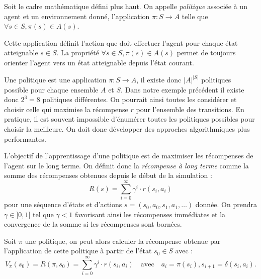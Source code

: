 \begin{definition}[Politique]
    Soit le cadre mathématique défini plus haut. On appelle \emph{politique} associée à un agent et un environnement donné, l'application $ \pi : S \longrightarrow A$ telle que $ \forall s \in S, \pi(s) \in A(s)$.
\end{definition}

Cette application définit l'action que doit effectuer l'agent pour chaque état atteignable $s \in S$. La propriété $ \forall s \in S, \pi(s) \in A(s)$ permet de toujours orienter l'agent vers un état atteignable depuis l'état courant. 

\begin{remark}
    Une politique est une application $ \pi : S \longrightarrow A$, il existe donc $ |A|^{|S|}$ politiques possible pour chaque ensemble $A$ et $S$. Dans notre exemple précédent il existe donc $2^3 = 8$ politiques différentes. On pourrait ainsi toutes les considérer et choisir celle qui maximise la récompense $r$ pour l'ensemble des transitions. En pratique, il est souvent impossible d'énumérer toutes les politiques possibles pour choisir la meilleure. On doit donc développer des approches algorithmiques plus performantes. 
\end{remark}

\begin{definition}
    L'objectif de l'apprentissage d'une politique est de maximiser les récompenses de l'agent sur le long terme. On définit donc la \emph{récompense à long terme} comme la somme des récompenses obtenues depuis le début de la simulation : 
    \begin{equation}
        R(s) = \sum_{i=0}^{\infty} \gamma^i \cdot r(s_i, a_i)
    \end{equation}
    pour une séquence d'états et d'actions $s = (s_0, a_0, s_1, a_1, \dots)$ donnée. On prendra $ \gamma \in ]0, 1]$ tel que $ \gamma < 1$ favorisant ainsi les récompenses immédiates et la convergence de la somme si les récompenses sont bornées. 
\end{definition}

\begin{proposition}
    Soit $ \pi$ une politique, on peut alors calculer la récompense obtenue par l'application de cette politique à partir de l'état $s_0 \in S$ avec :
    \begin{equation}
        V_\pi(s_0) = R( \pi, s_0) = \sum_{i=0}^{\infty} \gamma^i \cdot r(s_i, a_i) \quad \text{avec} \quad a_i = \pi(s_i), s_{i+1} = \delta(s_i, a_i). 
    \end{equation}
\end{proposition}

